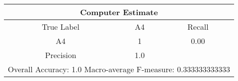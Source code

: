 \begin{tabular}{|c||c||c|}
\hline 
\multicolumn{3}{|c|}{Computer Estimate}\\
\hline 
True Label & A4 & Recall \\
\hline 
A4 & 1 &  0.00\\
\hline 
Precision & 1.0 & \\
\hline 
\multicolumn{3}{|c|}{Overall Accuracy: 1.0 Macro-average F-measure: 0.333333333333}\\
\hline 
\end{tabular} 
